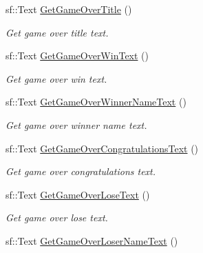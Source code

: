 \begin{DoxyCompactItemize}
\mbox{\label{class_scene_afabdeb9a701ec252fe30e9da5b112f28}} 
sf\+::\+Text \hyperlink{class_scene_afabdeb9a701ec252fe30e9da5b112f28}{Get\+Game\+Over\+Title} ()
\begin{DoxyCompactList}\small\item\em Get game over title text. \end{DoxyCompactList}\item 
\mbox{\label{class_scene_a798247e1af7411704abbc1ff37e3cc90}} 
sf\+::\+Text \hyperlink{class_scene_a798247e1af7411704abbc1ff37e3cc90}{Get\+Game\+Over\+Win\+Text} ()
\begin{DoxyCompactList}\small\item\em Get game over win text. \end{DoxyCompactList}\item 
\mbox{\label{class_scene_af4e7a704107a6a2a2f2fc272b74e9c7a}} 
sf\+::\+Text \hyperlink{class_scene_af4e7a704107a6a2a2f2fc272b74e9c7a}{Get\+Game\+Over\+Winner\+Name\+Text} ()
\begin{DoxyCompactList}\small\item\em Get game over winner name text. \end{DoxyCompactList}\item 
\mbox{\label{class_scene_a914f803fcc95618fb7b30ce67ec7da43}} 
sf\+::\+Text \hyperlink{class_scene_a914f803fcc95618fb7b30ce67ec7da43}{Get\+Game\+Over\+Congratulations\+Text} ()
\begin{DoxyCompactList}\small\item\em Get game over congratulations text. \end{DoxyCompactList}\item 
\mbox{\label{class_scene_ac0459bb78a21a66f041f1d2ca4be2180}} 
sf\+::\+Text \hyperlink{class_scene_ac0459bb78a21a66f041f1d2ca4be2180}{Get\+Game\+Over\+Lose\+Text} ()
\begin{DoxyCompactList}\small\item\em Get game over lose text. \end{DoxyCompactList}\item 
\mbox{\label{class_scene_aa2edffc8f2f4a04b033e4ee9f46fb618}} 
sf\+::\+Text \hyperlink{class_scene_aa2edffc8f2f4a04b033e4ee9f46fb618}{Get\+Game\+Over\+Loser\+Name\+Text} ()

\end{DoxyCompactItemize}
